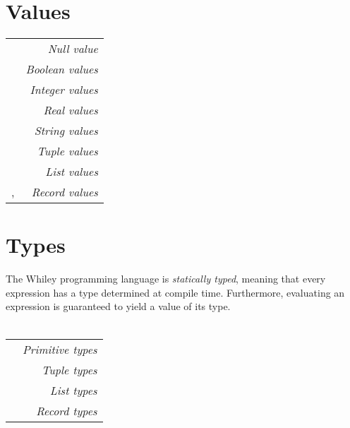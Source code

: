 \documentclass[a4paper,10pt,twcolumn]{article}
\date{}
\newcommand{\token}[1]{\Large\strut\scriptsize\fcolorbox{black}{lightgray}{\strut#1}}
\begin{document}

\section*{Values}
\begin{tabular}{l r}
\token{\lstinline+null+} & {\em Null value}\\
\token{\lstinline+true+} \token{\lstinline+false+} & {\em Boolean values}\\
\token{\lstinline+123+} \token{\lstinline+-99+} \token{\lstinline+0xFF+} & {\em Integer values}\\
\token{\lstinline+1.23+} \token{\lstinline+-0.02+} & {\em Real values}\\
\token{\lstinline+"Hello"+} \token{\lstinline+"new\n line"+} & {\em String values}\\
\token{\lstinline+(1,2,3)+} \token{\lstinline+(true,null)+} & {\em Tuple values}\\
\token{\lstinline+[]+} \token{\lstinline+[1,2,3]+} \token{\lstinline+[1,"hello",2.0]+} & {\em List values}\\
\token{\lstinline+\{name: "dave"\}+}, \token{\lstinline+\{x: 1, y: 0\}+} & {\em Record values}\\
\end{tabular}
\section*{Types}
The Whiley programming language is {\em statically typed}, meaning that every expression has a type determined at compile time.  Furthermore, evaluating an expression is guaranteed to yield a value of its type.\\\\ 
\begin{tabular}{l r}
\token{\lstinline+null+} \token{\lstinline+bool+} \token{\lstinline+int+} \token{\lstinline+real+} \token{\lstinline+string+} & {\em Primitive types}\\
\token{\lstinline+(int,int)+} \token{\lstinline+(int,null,bool)+} & {\em Tuple types}\\
\token{\lstinline+[int]+} \token{\lstinline+[[bool]]+} \token{\lstinline+[int|null]+} & {\em List types}\\
\token{\lstinline+\{bool f\}+} \token{\lstinline+\{int len, [int] is\}+} & {\em Record types}\\
\end{tabular}
\end{document}
